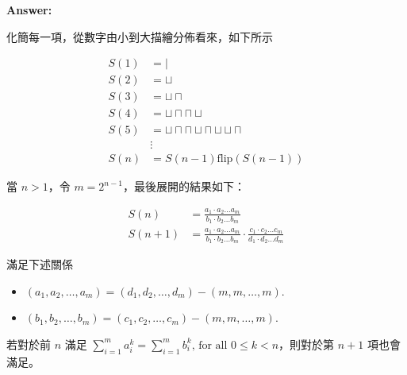 \documentclass[11pt]{article}
\renewcommand\part[1]{\vspace{.10in}\textbf{#1}}
\begin{document}
\part{Answer:}

化簡每一項，從數字由小到大描繪分佈看來，如下所示

\begin{align*}
	S(1) &= | \\
	S(2) &= \sqcup \\
	S(3) &= \sqcup \sqcap \\
	S(4) &= \sqcup \sqcap \sqcap \sqcup \\
	S(5) &= \sqcup \sqcap \sqcap \sqcup \sqcap \sqcup \sqcup \sqcap \\
		 & \vdots \\
	S(n) &= S(n-1) \text{flip}(S(n-1)) 
\end{align*}

當 $n > 1$，令 $m = 2^{n-1}$，最後展開的結果如下：

\begin{align*}
	S(n) &= \frac{a_1 \cdot a_2 \hdots a_m}{b_1 \cdot b_2 \hdots b_m} \\ 
	S(n+1) &= \frac{a_1 \cdot a_2 \hdots a_m}{b_1 \cdot b_2 \hdots b_m} \cdot 
			\frac{c_1 \cdot c_2 \hdots c_m}{d_1 \cdot d_2 \hdots d_m}
\end{align*}

滿足下述關係

\begin{itemize}
	\item $(a_1, a_2, \hdots, a_m) = (d_1, d_2, \hdots, d_m) - (m, m, \hdots, m)$.
	\item $(b_1, b_2, \hdots, b_m) = (c_1, c_2, \hdots, c_m) - (m, m, \hdots, m)$.
\end{itemize}

若對於前 $n$ 滿足 $\sum_{i=1}^{m} a_i^k = \sum_{i=1}^{m} b_i^k \text{, for all } 0 \le k < n$，則對於第 $n+1$ 項也會滿足。
\end{document}
